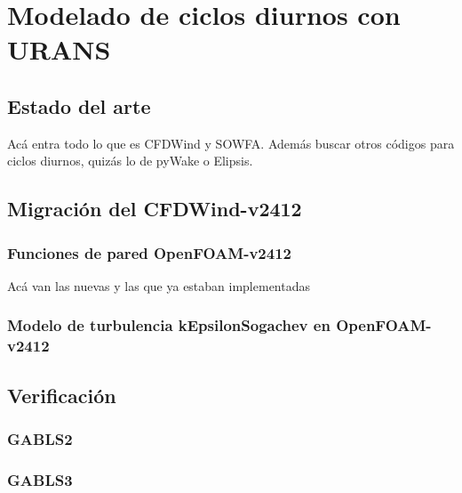 \chapter{Modelado de ciclos diurnos con URANS}

\section{Estado del arte}

Acá entra todo lo que es CFDWind y SOWFA. Además buscar otros códigos para ciclos diurnos, quizás
lo de pyWake o Elipsis.

\section{Migración del CFDWind-v2412}

\subsection{Funciones de pared OpenFOAM-v2412}

Acá van las nuevas y las que ya estaban implementadas

\subsection{Modelo de turbulencia kEpsilonSogachev en OpenFOAM-v2412}

\section{Verificación}

\subsection{GABLS2}

\subsection{GABLS3}


